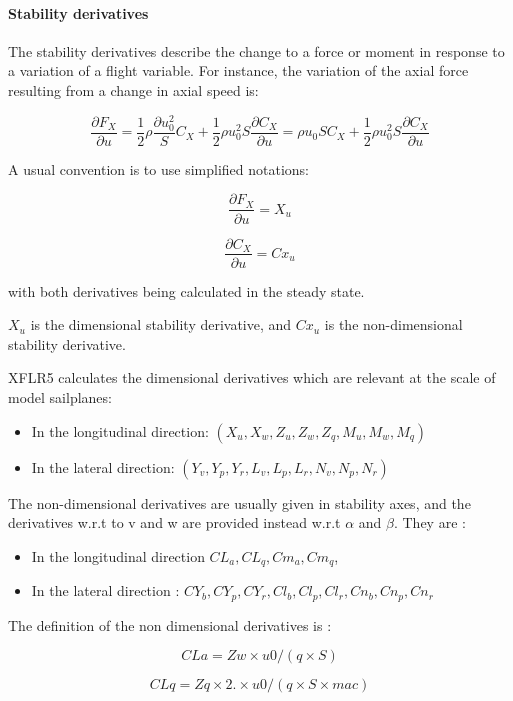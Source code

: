 \documentclass[a4paper,twoside,12pt,dvips]{article}
\begin{document}
\paragraph{Stability derivatives}

The stability derivatives describe the change to a force or moment in
response to a variation of a flight variable. For instance, the
variation of the axial force resulting from a change in axial speed
is:

$$\frac{\partial F_X}{\partial u} = 
\frac{1}{2}\rho \frac{\partial u_{0}^{2}} S C_X + 
\frac{1}{2}\rho u_{0}^{2} S \frac{\partial C_X}{\partial u}
= \rho u_{0} S C_{X} +
\frac{1}{2} \rho u_{0}^{2} S \frac{\partial C_{X}}{\partial u}$$

A usual convention is to use simplified notations:

$$\frac{\partial F_X}{\partial u} = X_u$$

$$\frac{\partial C_X}{\partial u} = Cx_u$$

with both derivatives being calculated in the steady state.

$X_u$ is the dimensional stability derivative, and
$Cx_u$ is the non-dimensional stability derivative.

XFLR5 calculates the dimensional derivatives which are relevant at the
scale of model sailplanes:

\begin{itemize}
\item In the longitudinal direction: $(X_u, X_w, Z_u, Z_w, Z_q, M_u, M_w, M_q)$
\item In the lateral direction: $(Y_v, Y_p, Y_r, L_v, L_p, L_r, N_v, N_p, N_r)$
\end{itemize}

The non-dimensional derivatives are usually given in stability axes, and
the derivatives w.r.t to v and w are provided instead w.r.t
$\alpha$ and $\beta$. They are :

\begin{itemize}
\item In the longitudinal direction $CL_a, CL_q, Cm_a, Cm_q$,
\item In the lateral direction : $CY_b, CY_p, CY_r, Cl_b, Cl_p, Cl_r, Cn_b, Cn_p, Cn_r$
\end{itemize}

The definition of the non dimensional derivatives is :

$$CLa = Zw \times u0  / (q \times S)$$

$$CLq = Zq \times 2. \times u0 / (q \times S \times mac)$$
\end{document}
